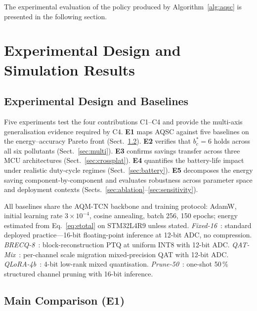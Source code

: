 \documentclass[12pt,a4paper]{article}
\begin{document}
\noindent The experimental evaluation of the policy produced by
Algorithm~\ref{alg:aqsc} is presented in the following section.

\section{Experimental Design and Simulation Results}
\label{sec:experiments}


\subsection{Experimental Design and Baselines}
\label{sec:expdesign}

Five experiments test the four contributions C1--C4 and provide the
multi-axis generalisation evidence required by C4.
\textbf{E1} maps AQSC against five baselines on the energy--accuracy
Pareto front (Sect.~\ref{sec:main}).
\textbf{E2} verifies that $b_c^*=6$ holds across all six pollutants
(Sect.~\ref{sec:multi}).
\textbf{E3} confirms savings transfer across three MCU architectures
(Sect.~\ref{sec:crossplat}).
\textbf{E4} quantifies the battery-life impact under realistic
duty-cycle regimes (Sect.~\ref{sec:battery}).
\textbf{E5} decomposes the energy saving component-by-component and
evaluates robustness across parameter space and deployment contexts
(Sects.~\ref{sec:ablation}--\ref{sec:sensitivity}).

All baselines share the AQM-TCN backbone and training protocol:
AdamW, initial learning rate $3\times10^{-4}$, cosine annealing,
batch 256, 150 epochs; energy estimated from Eq.~\eqref{eq:etotal}
on STM32L4R9 unless stated.
\textit{Fixed-16}~\cite{ma2023aqedge,chen2023tinyml}: standard
deployed practice---16-bit floating-point inference at 12-bit ADC,
no compression.
\textit{BRECQ-8}~\cite{li2021brecq}: block-reconstruction PTQ at
uniform INT8 with 12-bit ADC.
\textit{QAT-Mix}~\cite{xiao2023smoothquant}: per-channel scale
migration mixed-precision QAT with 12-bit ADC.
\textit{QLoRA-4b}~\cite{dettmers2023qlora}: 4-bit low-rank mixed
quantisation.
\textit{Prune-50}~\cite{frantar2023sparsegpt}: one-shot 50\,\%
structured channel pruning with 16-bit inference.

\subsection{Main Comparison (E1)}
\label{sec:main}
\end{document}
